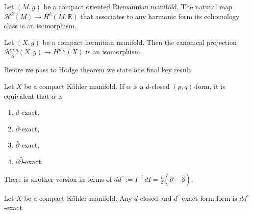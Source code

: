 \documentclass{book}
\begin{document}
\begin{lemma}
\label{lemma-de-rham-to-harmonic}
\begin{reference}
\cite[Corollary A.0.17]{huc}
\end{reference}
Let $(M,g)$ be a compact oriented Riemannian
manifold.
The natural map $\mathcal{H}^k(M) \to
H^k(M,\mathbb{R})$
that associates to any harmonic form its
cohomology class is
an isomorphism.
\end{lemma}

\begin{lemma}
\label{lemma-harmo-pq-dolbe-pq}
Let $(X,g)$ be a compact hermitian manifold.
Then the canonical projection
$\mathcal{H}_{\bar\partial}^{p,q}(X,g)\to
H^{p,q}(X)$
is an isomorphism.
\end{lemma}

\medskip\noindent
Before we pass to Hodge theorem we state one
final key result

\begin{lemma}
\label{lemma-ddbar}
Let $X$ be a compact Kähler manifold.
If $\alpha$ is a $d$-closed $(p,q)$-form,
it is equivalent that $\alpha$ is
\begin{enumerate}
\item $d$-exact,
\item $\partial$-exact,
\item $\bar\partial$-exact,
\item $\partial \bar\partial$-exact.
\end{enumerate}
\end{lemma}

\noindent
There is another version in terms of
$dd^c:=
I^{-1}dI=\frac{1}{2}(\partial-\bar\partial)$.

\begin{lemma}
\label{lemma-ddc}
\begin{reference}
\cite[Lemma 3.A.22]{huc}
\end{reference}
Let $X$ be a compact Kähler manifold.
Any $d$-closed and $d^c$-exact form form is
$dd^c$-exact.
\end{lemma}
\end{document}
